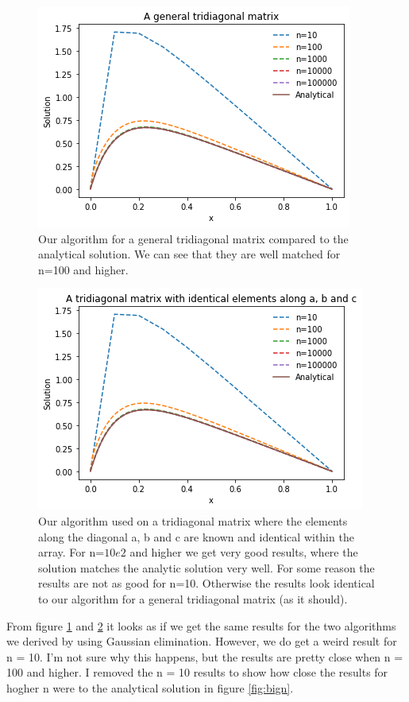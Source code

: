 \documentclass[oneside, final, 11pt, english, twocolumn]{article}
\begin{document}
\begin{figure}[H]
\centering
    \includegraphics[width=0.8\columnwidth]{sol_general.png}
\caption{Our algorithm for a general tridiagonal matrix compared to the analytical solution. We can see that they are well matched for n=100 and higher. }
\label{fig:method1}
\end{figure}

\begin{figure}[H]
\centering
    \includegraphics[width=0.8\columnwidth]{sol1.png}
\caption{Our algorithm used on a tridiagonal matrix where the elements along the diagonal a, b and c are known and identical within the array. For n=$10e2$ and higher we get very good results, where the solution matches the analytic solution very well. For some reason the results are not as good for n=10. Otherwise the results look identical to our algorithm for a general tridiagonal matrix (as it should). }
\label{fig:method2}
\end{figure}

From figure \ref{fig:method1} and \ref{fig:method2} it looks as if we get the same results for the two algorithms we derived by using Gaussian elimination. However, we do get a weird result for n = 10. I'm not sure why this happens, but the results are pretty close when n = 100 and higher. I removed the n = 10 results to show how close the results for hogher n were to the analytical solution in figure \ref{fig:bign}. 
\end{document}
